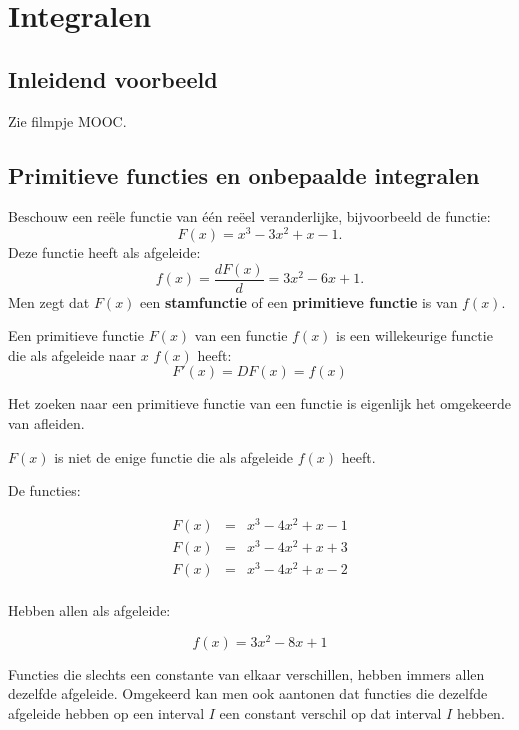 \section{Integralen}

\subsection{Inleidend voorbeeld}
Zie filmpje MOOC.

\subsection{Primitieve functies en onbepaalde integralen}

Beschouw een re\"ele functie van \'e\'en re\"eel veranderlijke, bijvoorbeeld de functie:
\begin{equation*}
F(x) = x^3-3x^2+x-1.
\end{equation*}
Deze functie heeft als afgeleide:
\begin{equation*}
f(x) = \frac{dF(x)}{d} = 3x^2-6x+1.
\end{equation*}
Men zegt dat $F(x)$ een \textbf{stamfunctie} of een \textbf{primitieve functie} is van $f(x)$.

\begin{definitie}
Een primitieve functie $F(x)$ van een functie $f(x)$ is een willekeurige functie die als afgeleide naar $x$ $f(x)$  heeft:	
\begin{equation*}
F'(x)=DF(x)=f(x)
\end{equation*}
\end{definitie}

Het zoeken naar een primitieve functie van een functie is eigenlijk het omgekeerde van afleiden.

$F(x)$ is niet de enige functie die als afgeleide $f(x)$ heeft.

De functies:

\begin{eqnarray*}
F(x) &=& x^3-4x^2+x-1 \\
F(x) &=& x^3-4x^2+x+3 \\
F(x) &=& x^3-4x^2+x-2 \\
\end{eqnarray*}

Hebben allen als afgeleide:

\begin{equation*}
f(x) = 3x^2-8x+1
\end{equation*}

Functies die slechts een constante van elkaar verschillen, hebben immers allen dezelfde afgeleide. Omgekeerd kan men ook aantonen dat functies die dezelfde afgeleide hebben op een interval $I$ een constant verschil op dat interval $I$ hebben.

